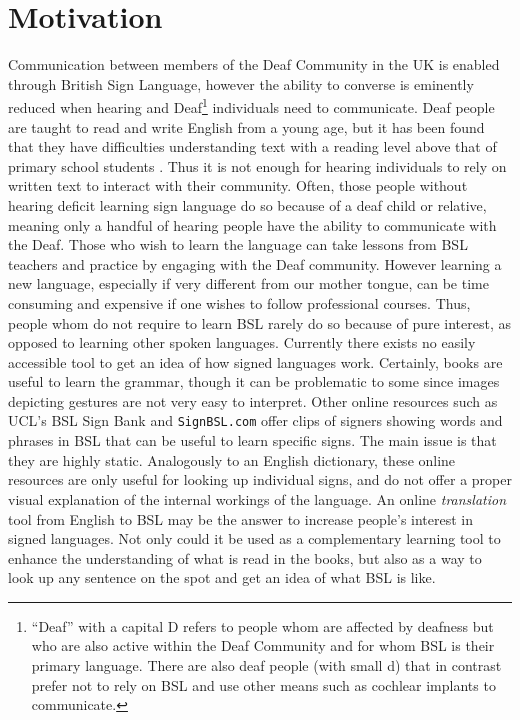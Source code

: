 \documentclass[12pt]{ociamthesis}  %
\begin{document}
\section{Motivation}
Communication between members of the Deaf Community in the UK is enabled through British Sign Language, however the ability to converse is eminently reduced when hearing and Deaf\footnote{``Deaf'' with a capital D refers to people whom are affected by deafness but who are also active within the Deaf Community and for whom BSL is their primary language. There are also deaf people (with small d) that in contrast prefer not to rely on BSL and use other means such as cochlear implants to communicate.} individuals need to communicate. Deaf people  are taught to read and write English from a young age, but it has been found that they have difficulties understanding text with a reading level above that of primary school students . Thus it is not enough for hearing individuals to rely on written text to interact with their community. Often, those people without hearing deficit learning sign language do so because of a deaf child or relative, meaning only a handful of hearing people have the ability to communicate with the Deaf. Those who wish to learn the language can take lessons from BSL teachers and practice by engaging with the Deaf community. However learning a new language, especially if very different from our mother tongue, can be time consuming and expensive if one wishes to follow professional courses. Thus, people whom do not require to learn BSL rarely do so because of pure interest, as opposed to learning other spoken languages. Currently there exists no easily accessible tool to get an idea of how signed languages work. Certainly, books are useful to learn the grammar, though it can be problematic to some since images depicting gestures are not very easy to interpret. Other online resources such as UCL's BSL Sign Bank  and \texttt{SignBSL.com}  offer clips of signers showing words and phrases in BSL that can be useful to learn specific signs. The main issue is that they are highly static. Analogously to an English dictionary, these online resources are only useful for looking up individual signs, and do not offer a proper visual explanation of the internal workings of the language. An online \textit{translation} tool from English to BSL may be the answer to increase people's interest in signed languages. Not only could it be used as a complementary learning tool to enhance the understanding of what is read in the books, but also as a way to look up any sentence on the spot and get an idea of what BSL is like. 
\end{document}
